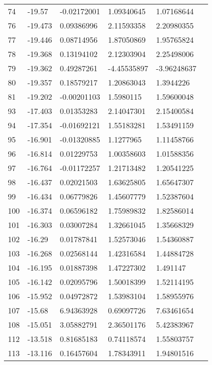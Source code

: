\begin{longtable}{XXXXXX}
    74    & -19.57 & -0.02172001 & 1.09340645 & 1.07168644 &  \\
    76    & -19.473 & 0.09386996 & 2.11593358 & 2.20980355 &  \\
    77    & -19.446 & 0.08714956 & 1.87050869 & 1.95765824 &  \\
    78    & -19.368 & 0.13194102 & 2.12303904 & 2.25498006 &  \\
    79    & -19.362 & 0.49287261 & -4.45535897 & -3.96248637 &  \\
    80    & -19.357 & 0.18579217 & 1.20863043 & 1.3944226 &  \\
    81    & -19.202 & -0.00201103 & 1.5980115 & 1.59600048 &  \\
    93    & -17.403 & 0.01353283 & 2.14047301 & 2.15400584 &  \\
    94    & -17.354 & -0.01692121 & 1.55183281 & 1.53491159 &  \\
    95    & -16.901 & -0.01320885 & 1.1277965 & 1.11458766 &  \\
    96    & -16.814 & 0.01229753 & 1.00358603 & 1.01588356 &  \\
    97    & -16.764 & -0.01172257 & 1.21713482 & 1.20541225 &  \\
    98    & -16.437 & 0.02021503 & 1.63625805 & 1.65647307 &  \\
    99    & -16.434 & 0.06779826 & 1.45607779 & 1.52387604 &  \\
    100   & -16.374 & 0.06596182 & 1.75989832 & 1.82586014 &  \\
    101   & -16.303 & 0.03007284 & 1.32661045 & 1.35668329 &  \\
    102   & -16.29 & 0.01787841 & 1.52573046 & 1.54360887 &  \\
    103   & -16.268 & 0.02568144 & 1.42316584 & 1.44884728 &  \\
    104   & -16.195 & 0.01887398 & 1.47227302 & 1.491147 &  \\
    105   & -16.142 & 0.02095796 & 1.50018399 & 1.52114195 &  \\
    106   & -15.952 & 0.04972872 & 1.53983104 & 1.58955976 &  \\
    107   & -15.68 & 6.94363928 & 0.69097726 & 7.63461654 &  \\
    108   & -15.051 & 3.05882791 & 2.36501176 & 5.42383967 &  \\
    112   & -13.518 & 0.81685183 & 0.74118574 & 1.55803757 &  \\
    113   & -13.116 & 0.16457604 & 1.78343911 & 1.94801516 &  \\

\end{longtable}

